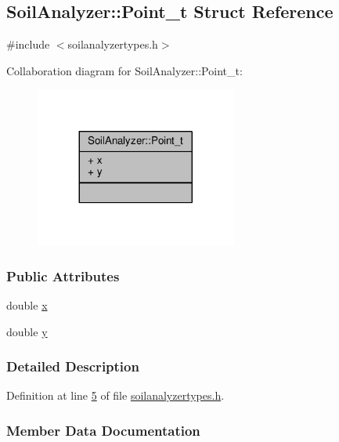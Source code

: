 \hypertarget{struct_soil_analyzer_1_1_point__t}{}\subsection{Soil\+Analyzer\+:\+:Point\+\_\+t Struct Reference}
\label{struct_soil_analyzer_1_1_point__t}


{\ttfamily \#include $<$soilanalyzertypes.\+h$>$}



Collaboration diagram for Soil\+Analyzer\+:\+:Point\+\_\+t\+:
\nopagebreak
\begin{figure}[H]
\begin{center}
\leavevmode
\includegraphics[width=188pt]{struct_soil_analyzer_1_1_point__t__coll__graph}
\end{center}
\end{figure}
\subsubsection*{Public Attributes}
\begin{DoxyCompactItemize}
\item 
double \hyperlink{struct_soil_analyzer_1_1_point__t_a926d8ebf458fddf1cc40e3df08a59e74}{x}
\item 
double \hyperlink{struct_soil_analyzer_1_1_point__t_ac3b3bcd50383851a31e9691fd9f0a8c0}{y}
\end{DoxyCompactItemize}


\subsubsection{Detailed Description}


Definition at line \hyperlink{soilanalyzertypes_8h_source_l00005}{5} of file \hyperlink{soilanalyzertypes_8h_source}{soilanalyzertypes.\+h}.



\subsubsection{Member Data Documentation}
\hypertarget{struct_soil_analyzer_1_1_point__t_a926d8ebf458fddf1cc40e3df08a59e74}{}
